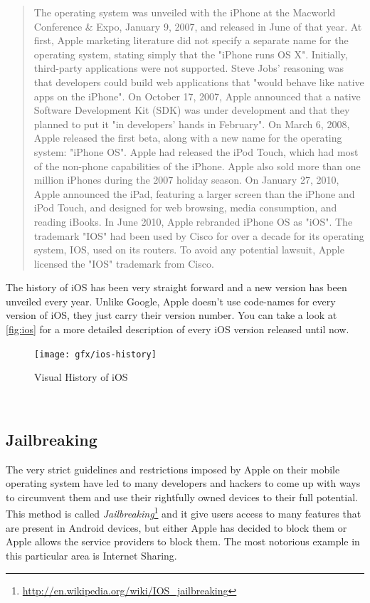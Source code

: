 \begin{quotation}
    The operating system was unveiled with the iPhone at the Macworld Conference \& Expo, January 9, 2007, and released in June of that year. At first, Apple marketing literature did not specify a separate name for the operating system, stating simply that the "iPhone runs OS X". Initially, third-party applications were not supported. Steve Jobs' reasoning was that developers could build web applications that "would behave like native apps on the iPhone". On October 17, 2007, Apple announced that a native Software Development Kit (SDK) was under development and that they planned to put it "in developers' hands in February". On March 6, 2008, Apple released the first beta, along with a new name for the operating system: "iPhone OS".
Apple had released the iPod Touch, which had most of the non-phone capabilities of the iPhone. Apple also sold more than one million iPhones during the 2007 holiday season. On January 27, 2010, Apple announced the iPad, featuring a larger screen than the iPhone and iPod Touch, and designed for web browsing, media consumption, and reading iBooks.
In June 2010, Apple rebranded iPhone OS as "iOS". The trademark "IOS" had been used by Cisco for over a decade for its operating system, IOS, used on its routers. To avoid any potential lawsuit, Apple licensed the "IOS" trademark from Cisco.
\cite{wikipedia:ios}
\end{quotation}

The history of iOS has been very straight forward and a new version has been unveiled every year. Unlike Google, Apple doesn't use code-names for every version of iOS, they just carry their version number. You can take a look at \autoref{fig:ios} for a more detailed description of every iOS version released until now.  

\begin{figure}[H]
    \begin{center}
        {\texttt{[image: gfx/ios-history]}}
        \caption[Visual History of iOS]{Visual History of iOS\footnotemark}\label{fig:ios}
    \end{center}
\end{figure}
\\

\subsection{Jailbreaking}
The very strict guidelines and restrictions imposed by Apple on their mobile operating system have led to many developers and hackers to come up with ways to circumvent them and use their rightfully owned devices to their full potential. This method is called \emph{Jailbreaking}\footnote{\url{http://en.wikipedia.org/wiki/IOS_jailbreaking}}  and it give users access to many features that are present in Android devices, but either Apple has decided to block them or Apple allows the service providers to block them. The most notorious example in this particular area is Internet Sharing. 


